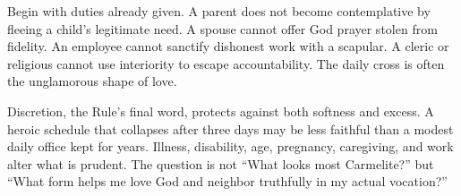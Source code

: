 Begin with duties already given. A parent does not become contemplative by fleeing a child's legitimate need. A spouse cannot offer God prayer stolen from fidelity. An employee cannot sanctify dishonest work with a scapular. A cleric or religious cannot use interiority to escape accountability. The daily cross is often the unglamorous shape of love.

Discretion, the Rule's final word, protects against both softness and excess. A heroic schedule that collapses after three days may be less faithful than a modest daily office kept for years. Illness, disability, age, pregnancy, caregiving, and work alter what is prudent. The question is not ``What looks most Carmelite?'' but ``What form helps me love God and neighbor truthfully in my actual vocation?''




